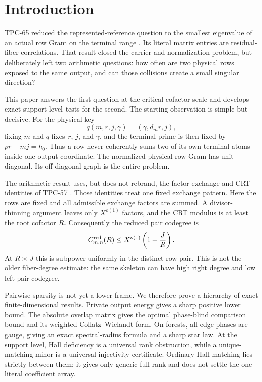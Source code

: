 \section{Introduction}

TPC-65 reduced the represented-reference question to the smallest eigenvalue
of an actual row Gram on the terminal range \citep{WangTPC65}. Its literal
matrix entries are residual-fiber correlations. That result closed the carrier
and normalization problem, but deliberately left two arithmetic questions:
how often are two physical rows exposed to the same output, and can those
collisions create a small singular direction?

This paper answers the first question at the critical cofactor scale and
develops exact support-level tests for the second. The starting observation is
simple but decisive. For the physical key
\[
 q(m,r,j,\gamma)=(\gamma,d_mr,j),
\]
fixing \(m\) and \(q\) fixes \(r\), \(j\), and \(\gamma\), and the terminal
prime is then fixed by \(pr-mj=h_0\). Thus a row never coherently sums two of
its own terminal atoms inside one output coordinate. The normalized physical
row Gram has unit diagonal. Its off-diagonal graph is the entire problem.

The arithmetic result uses, but does not rebrand, the factor-exchange and CRT
identities of TPC-57 \citep{WangTPC57}. Those identities treat one fixed
exchange pattern. Here the rows are fixed and all admissible exchange factors
are summed. A divisor-thinning argument leaves only \(X^{o(1)}\) factors, and
the CRT modulus is at least the root cofactor \(R\). Consequently the reduced
pair codegree is
\[
 C_{m,n}^{\rm red}(R)
 \le X^{o(1)}\left(1+\frac JR\right).
\]
At \(R\asymp J\) this is subpower uniformly in the distinct row pair. This is
not the older fiber-degree estimate: the same skeleton can have high right
degree and low left pair codegree.

Pairwise sparsity is not yet a lower frame. We therefore prove a hierarchy of
exact finite-dimensional results. Private output energy gives a sharp positive
lower bound. The absolute overlap matrix gives the optimal phase-blind
comparison bound and its weighted Collatz--Wielandt form. On forests, all edge
phases are gauge, giving an exact spectral-radius formula and a sharp star law.
At the support level, Hall deficiency is a universal rank obstruction, while a
unique-matching minor is a universal injectivity certificate. Ordinary Hall
matching lies strictly between them: it gives only generic full rank and does
not settle the one literal coefficient array.

